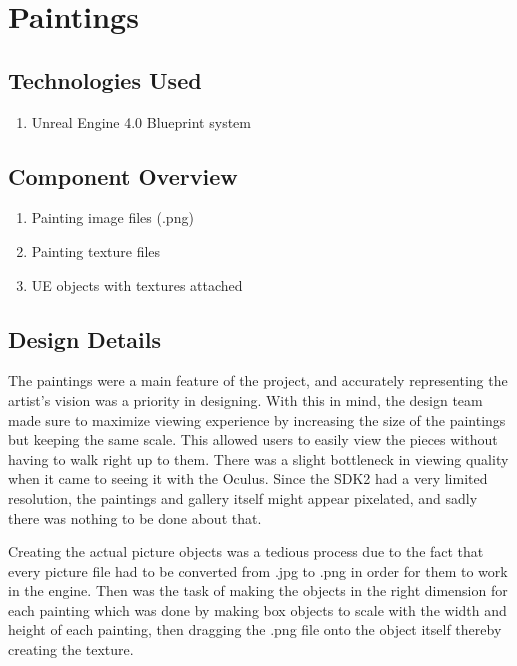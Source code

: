 


\section{Paintings }

\subsection{Technologies  Used}
\begin{enumerate}
\item Unreal Engine 4.0 Blueprint system
\end{enumerate}

\subsection{Component  Overview}
\begin{enumerate}
\item Painting image files (.png)
\item Painting texture files
\item UE objects with textures attached
\end{enumerate}



\subsection{Design Details}
The paintings were a main feature of the project, and accurately representing the artist's vision was a priority in designing.  With this in mind, the design team made sure to maximize viewing experience by increasing the size of the paintings but keeping the same scale.  This allowed users to easily view the pieces without having to walk right up to them.  There was a slight bottleneck in viewing quality when it came to seeing it with the Oculus.  Since the SDK2 had a very limited resolution, the paintings and gallery itself might appear pixelated, and sadly there was nothing to be done about that.

Creating the actual picture objects was a tedious process due to the fact that every picture file had to be converted from .jpg to .png in order for them to work in the engine.  Then was the task of making the objects in the right dimension for each painting which was done by making box objects to scale with the width and height of each painting, then dragging the .png file onto the object itself thereby creating the texture.


